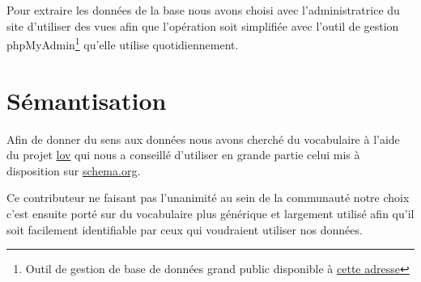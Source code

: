 \documentclass[12pt,a4paper]{article}
\begin{document}
	Pour extraire les données de la base nous avons choisi avec l'administratrice du site d'utiliser des vues afin que l'opération soit simplifiée avec l'outil de gestion phpMyAdmin\footnote{Outil de gestion de base de données grand public disponible à \href{http://www.phpmyadmin.net/home_page/index.php}{cette adresse}} qu'elle utilise quotidiennement.
	
	\section{Sémantisation}	
	Afin de donner du sens aux données nous avons cherché du vocabulaire à l'aide du projet \href{http://lov.okfn.org/dataset/lov/}{lov} qui nous a conseillé d'utiliser en grande partie celui mis à disposition sur \href{http://schema.org}{schema.org}. 
	
	Ce contributeur ne faisant pas l'unanimité au sein de la communauté notre choix c'est ensuite porté sur du vocabulaire plus générique et largement utilisé afin qu'il soit facilement identifiable par ceux qui voudraient utiliser nos données.
	
\end{document}
